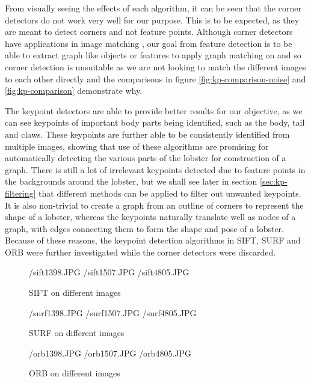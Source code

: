 \noindent
From visually seeing the effects of each algorithm, it can be seen that the corner detectors do not work very well for our purpose. This is to be expected, as they are meant to detect corners and not feature points. Although corner detectors have applications in image matching \cite{corner-detection}, our goal from feature detection is to be able to extract graph like objects or features to apply graph matching on and so corner detection is unsuitable as we are not looking to match the different images to each other directly and the comparisons in figure \ref{fig:kp-comparison-noise} and \ref{fig:kp-comparison} demonstrate why.

The keypoint detectors are able to provide better results for our objective, as we can see keypoints of important body parts being identified, such as the body, tail and claws. These keypoints are further able to be consistently identified from multiple images, showing that use of these algorithms are promising for automatically detecting the various parts of the lobster for construction of a graph. There is still a lot of irrelevant keypoints detected due to feature points in the backgrounds around the lobster, but we shall see later in section \ref{sec:kp-filtering} that different methods can be applied to filter out unwanted keypoints. It is also non-trivial to create a graph from an outline of corners to represent the shape of a lobster, whereas the keypoints naturally translate well as nodes of a graph, with edges connecting them to form the shape and pose of a lobster. Because of these reasons, the keypoint detection algorithms in SIFT, SURF and ORB were further investigated while the corner detectors were discarded.

\begin{figure}[H]
\centering
\threefig
{\imgpath/sift1398.JPG}{}
{\imgpath/sift1507.JPG}{}
{\imgpath/sift4805.JPG}{}
\caption{SIFT on different images}
\end{figure}	


\begin{figure}[H]
  \threefig
  {\imgpath/surf1398.JPG}{}
  {\imgpath/surf1507.JPG}{}
  {\imgpath/surf4805.JPG}{}
\caption{SURF on different images}
\end{figure}


\begin{figure}[H]
  \threefig
  {\imgpath/orb1398.JPG}{}
  {\imgpath/orb1507.JPG}{}
  {\imgpath/orb4805.JPG}{}
\caption{ORB on different images}
\end{figure}


